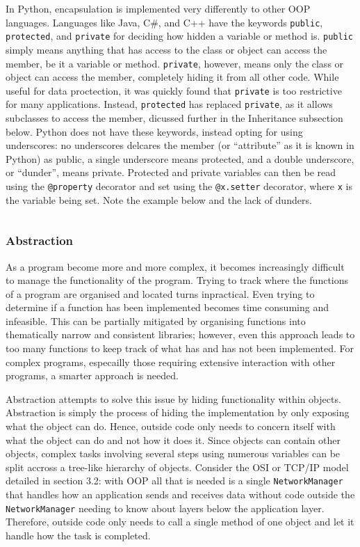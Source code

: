 \documentclass[11pt]{article}
\begin{document}
In Python, encapsulation is implemented very differently to other OOP languages. Languages like Java, C\#, and C++ have the keywords \texttt{public}, \texttt{protected}, and \texttt{private} for deciding how hidden a variable or method is. \texttt{public} simply means anything that has access to the class or object can access the member, be it a variable or method. \texttt{private}, however, means only the class or object can access the member, completely hiding it from all other code. While useful for data proctection, it was quickly found that \texttt{private} is too restrictive for many applications. Instead, \texttt{protected} has replaced \texttt{private}, as it allows subclasses to access the member, dicussed further in the Inheritance subsection below. Python does not have these keywords, instead opting for using underscores: no underscores delcares the member (or ``attribute'' as it is known in Python) as public, a single underscore means protected, and a double underscore, or ``dunder'', means private. Protected and private variables can then be read using the \texttt{@property} decorator and set using the \texttt{@x.setter} decorator, where \texttt{x} is the variable being set. Note the example below and the lack of dunders.

\inputminted[linenos=true]{python}{python_examples/encapsulation.py}

\subsubsection{Abstraction}

As a program become more and more complex, it becomes increasingly difficult to manage the functionality of the program. Trying to track where the functions of a program are organised and located turns inpractical. Even trying to determine if a function has been implemented becomes time consuming and infeasible. This can be partially mitigated by organising functions into thematically narrow and consistent libraries; however, even this approach leads to too many functions to keep track of what has and has not been implemented. For complex programs, especailly those requiring extensive interaction with other programs, a smarter approach is needed.

Abstraction attempts to solve this issue by hiding functionality within objects. Abstraction is simply the process of hiding the implementation by only exposing what the object can do. Hence, outside code only needs to concern itself with what the object can do and not how it does it. Since objects can contain other objects, complex tasks involving several steps using numerous variables can be split accross a tree-like hierarchy of objects. Consider the OSI or TCP/IP model detailed in section 3.2: with OOP all that is needed is a single \texttt{NetworkManager} that handles how an application sends and receives data without code outside the \texttt{NetworkManager} needing to know about layers below the application layer. Therefore, outside code only needs to call a single method of one object and let it handle how the task is completed.
\end{document}
